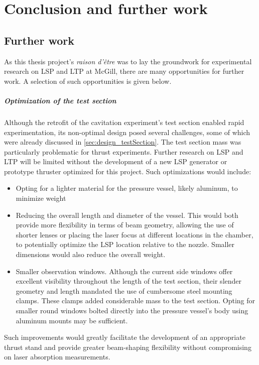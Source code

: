 \chapter{Conclusion and further work}

    \section{Further work}
        As this thesis project's \emph{raison d'être} was to lay the groundwork for experimental research on LSP and LTP at McGill, there are many opportunities for further work. A selection of such opportunities is given below.

        \paragraph{Optimization of the test section} Although the retrofit of the cavitation experiment's test section enabled rapid experimentation, its non-optimal design posed several challenges, some of which were already discussed in \autoref{sec:design_testSection}. The test section mass was particularly problematic for thrust experiments. Further research on LSP and LTP will be limited without the development of a new LSP generator or prototype thruster optimized for this project. Such optimizations would include:
        \begin{itemize}
            \item Opting for a lighter material for the pressure vessel, likely aluminum, to minimize weight
            \item Reducing the overall length and diameter of the vessel. This would both provide more flexibility in terms of beam geometry, allowing the use of shorter lenses or placing the laser focus at different locations in the chamber, to potentially optimize the LSP location relative to the nozzle. Smaller dimensions would also reduce the overall weight.
            \item Smaller observation windows. Although the current side windows offer excellent visibility throughout the length of the test section, their slender geometry and length mandated the use of cumbersome steel mounting clamps. These clamps added considerable mass to the test section. Opting for smaller round windows bolted directly into the pressure vessel's body using aluminum mounts may be sufficient.
        \end{itemize}
        Such improvements would greatly facilitate the development of an appropriate thrust stand and provide greater beam-shaping flexibility without compromising on laser absorption measurements.

